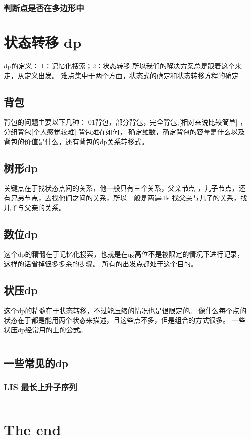 \documentclass[a4paper,11pt]{article}
\begin{document}
\begin{CJK}{UTF8}{gbsn}
\subsubsection{判断点是否在多边形中}



\section{状态转移 dp}
dp的定义：
1：记忆化搜索；2：状态转移
所以我们的解决方案总是跟着这个来走，从定义出发。
难点集中于两个方面，状态式的确定和状态转移方程的确定
\subsection{背包}
背包的问题主要以下几种：
01背包，部分背包，完全背包;[相对来说比较简单] ，分组背包[个人感觉较难]
背包难在如何， 确定维数，确定背包的容量是什么以及背包的价值是什么，还有背包的dp关系转移式。
\subsection{树形dp}
关键点在于找状态点间的关系，他一般只有三个关系，父亲节点
，儿子节点，还有兄弟节点，去找他们之间的关系，所以一般是两遍dfs
找父亲与儿子的关系，找儿子与父亲的关系。
\subsection{数位dp}
这个dp的精髓在于记忆化搜索，也就是在最高位不是被限定的情况下进行记录，这样的话省掉很多多余的步骤。
所有的出发点都处于这个目的。
\subsection{状压dp}
这个dp的精髓在于状态转移，不过能压缩的情况也是很限定的。
像什么每个点的状态在于都是能用两个状态来描述，且这些点不多，但是组合的方式很多。
一些状压dp经常用的上的公式。
\inputminted{c++}{../scoure/dp/zhuangtai.cpp}
\subsection{一些常见的dp}
\subsubsection{LIS 最长上升子序列}
\inputminted{c++}{../scoure/dp/longerxuelie.cpp}

\section{The end}


\end{CJK}
\end{document}
